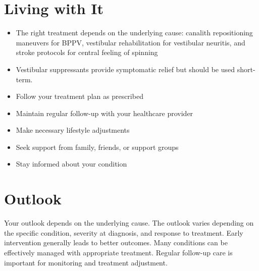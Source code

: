 \section{Living with It}
\begin{itemize}[noitemsep]
  \item The right treatment depends on the underlying cause: canalith repositioning maneuvers for BPPV, vestibular rehabilitation for vestibular neuritis, and stroke protocols for central feeling of spinning
  \item Vestibular suppressants provide symptomatic relief but should be used short-term.
  \item Follow your treatment plan as prescribed
  \item Maintain regular follow-up with your healthcare provider
  \item Make necessary lifestyle adjustments
  \item Seek support from family, friends, or support groups
  \item Stay informed about your condition
\end{itemize}
\section{Outlook}
Your outlook depends on the underlying cause. The outlook varies depending on the specific condition, severity at diagnosis, and response to treatment. Early intervention generally leads to better outcomes. Many conditions can be effectively managed with appropriate treatment. Regular follow-up care is important for monitoring and treatment adjustment.
